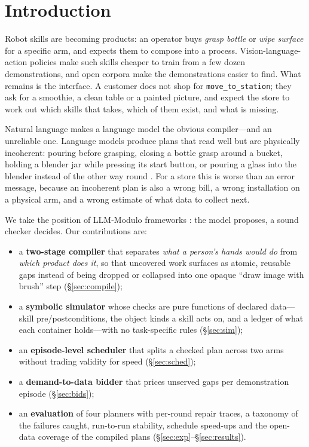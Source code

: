 \documentclass[10pt,twocolumn,letterpaper]{article}
\newcommand{\code}[1]{\texttt{\small #1}}
\begin{document}
\section{Introduction}
Robot skills are becoming products: an operator buys \emph{grasp bottle} or
\emph{wipe surface} for a specific arm, and expects them to compose into a process.
Vision-language-action policies \cite{brohan2023rt2,kim2024openvla,octo2024,black2024pi0}
make such skills cheaper to train from a few dozen demonstrations, and open corpora
\cite{oxe2024,khazatsky2024droid,cadene2024lerobot} make the demonstrations easier
to find. What remains is the interface. A customer does not shop for
\code{move\_to\_station}; they ask for a smoothie, a clean table or a painted
picture, and expect the store to work out which skills that takes, which of them
exist, and what is missing.

Natural language makes a language model the obvious compiler---and an unreliable
one. Language models produce plans that read well but are physically incoherent:
pouring before grasping, closing a bottle grasp around a bucket, holding a blender
jar while pressing its start button, or pouring a glass into the blender instead of
the other way round \cite{valmeekam2023planbench,kambhampati2024llmmodulo}. For a
store this is worse than an error message, because an incoherent plan is also a
wrong bill, a wrong installation on a physical arm, and a wrong estimate of what
data to collect next.

We take the position of LLM-Modulo frameworks \cite{kambhampati2024llmmodulo}: the
model proposes, a sound checker decides. Our contributions are:
\begin{itemize}
\item a \textbf{two-stage compiler} that separates \emph{what a person's hands
  would do} from \emph{which product does it}, so that uncovered work surfaces as
  atomic, reusable gaps instead of being dropped or collapsed into one opaque
  ``draw image with brush'' step (\S\ref{sec:compile});
\item a \textbf{symbolic simulator} whose checks are pure functions of declared
  data---skill pre/postconditions, the object kinds a skill acts on, and a ledger of
  what each container holds---with no task-specific rules (\S\ref{sec:sim});
\item an \textbf{episode-level scheduler} that splits a checked plan across two
  arms without trading validity for speed (\S\ref{sec:sched});
\item a \textbf{demand-to-data bidder} that prices unserved gaps per demonstration
  episode (\S\ref{sec:bids});
\item an \textbf{evaluation} of four planners with per-round repair traces, a
  taxonomy of the failures caught, run-to-run stability, schedule speed-ups and the
  open-data coverage of the compiled plans (\S\ref{sec:exp}--\S\ref{sec:results}).
\end{itemize}
\end{document}
